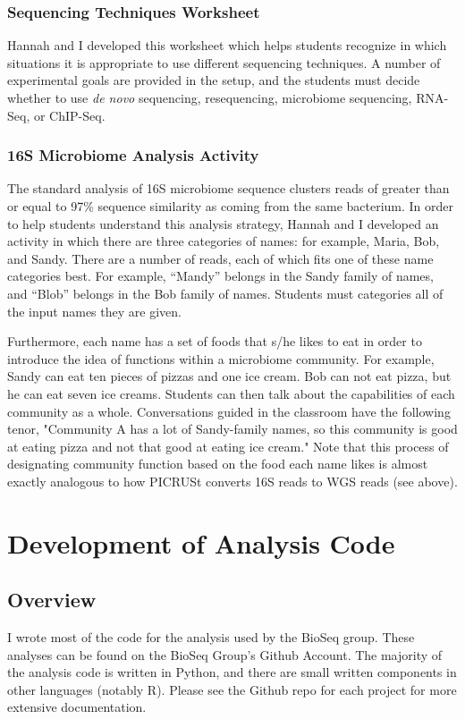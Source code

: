 \documentclass{report}
\begin{document}
\subsection{Sequencing Techniques Worksheet}
Hannah and I developed this worksheet which helps students recognize in which situations it is appropriate to use different sequencing techniques. A number of experimental goals are provided in the setup, and the students must decide whether to use \emph{de novo} sequencing, resequencing, microbiome sequencing, RNA-Seq, or ChIP-Seq.

\subsection{16S Microbiome Analysis Activity}
The standard analysis of 16S microbiome sequence clusters reads of greater than or equal to 97\% sequence similarity as coming from the same bacterium. In order to help students understand this analysis strategy, Hannah and I developed an activity in which there are three categories of names: for example, Maria, Bob, and Sandy. There are a number of reads, each of which fits one of these name categories best. For example, ``Mandy'' belongs in the Sandy family of names, and ``Blob'' belongs in the Bob family of names. Students must categories all of the input names they are given.

Furthermore, each name has a set of foods that s/he likes to eat in order to introduce the idea of functions within a microbiome community. For example, Sandy can eat ten pieces of pizzas and one ice cream. Bob can not eat pizza, but he can eat seven ice creams. Students can then talk about the capabilities of each community as a whole. Conversations guided in the classroom have the following tenor, "Community A has a lot of Sandy-family names, so this community is good at eating pizza and not that good at eating ice cream." Note that this process of designating community function based on the food each name likes is almost exactly analogous to how PICRUSt converts 16S reads to WGS reads (see above).


\chapter{Development of Analysis Code}
\section{Overview}
I wrote most of the code for the analysis used by the BioSeq group. These analyses can be found on the BioSeq Group's Github Account. The majority of the analysis code is written in Python, and there are small written components in other languages (notably R). Please see the Github repo for each project for more extensive documentation.
\end{document}
